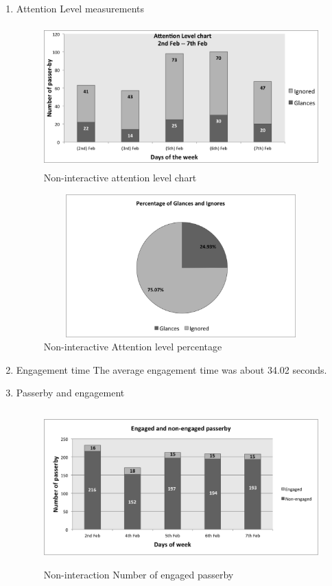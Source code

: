 \begin{enumerate}

\item Attention Level measurements

\begin{figure}[H]
    \centering
    \includegraphics[width=110mm,height=55mm]{Figures/8/non_inter_findings/Non_Inter_chart}%
    \caption{Non-interactive attention level chart}%
    \label{fig:Nonattentionlevelchart}%
\end{figure}



\begin{figure}[H]
    \centering
    \includegraphics[width=110mm,height=55mm]{Figures/8/non_inter_findings/non_inter_percentage}
    \caption{Non-interactive Attention level percentage}%
    \label{fig:Nonattentionlevelpercentage}%
\end{figure}



\item Engagement time
The average engagement time was about 34.02 seconds.

\item Passerby and engagement


\begin{figure}[H]
    \centering
    \includegraphics[width=110mm,height=60mm]{Figures/8/non_inter_findings/non_inter_engage_day}
    \caption{Non-interaction Number of engaged passerby}%
    \label{fig:Nonengagedandengagedby}%
\end{figure}


\end{enumerate}
